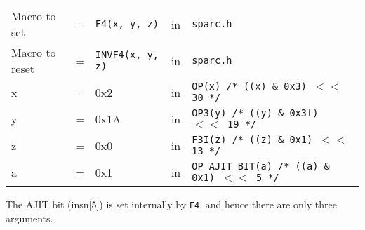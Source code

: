 \begin{enumerate}
  \begin{tabular}[h]{lclcl}
    Macro to set  &=& \texttt{F4(x, y, z)} &in& \texttt{sparc.h}     \\
    Macro to reset  &=& \texttt{INVF4(x, y, z)} &in& \texttt{sparc.h}     \\
    x &=& 0x2      &in& \texttt{OP(x)  /* ((x) \& 0x3)  $<<$ 30 */} \\
    y &=& 0x1A     &in& \texttt{OP3(y) /* ((y) \& 0x3f) $<<$ 19 */} \\
    z &=& 0x0      &in& \texttt{F3I(z) /* ((z) \& 0x1)  $<<$ 13 */} \\
    a &=& 0x1      &in& \texttt{OP\_AJIT\_BIT(a) /* ((a) \& 0x1)  $<<$ 5 */}
  \end{tabular}

  The AJIT bit  (insn[5]) is set internally by  \texttt{F4}, and hence
  there are only three arguments.


\end{enumerate}
